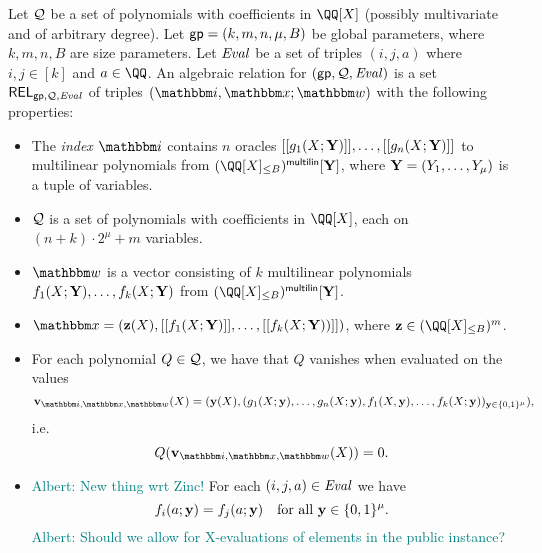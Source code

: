 \documentclass[11pt,letterpaper,usenames,dvipsnames]{article}
\newcommand{\albert}[1]{\textcolor{teal}{Albert: {#1}}}
\begin{document}
Let $\mathcal{Q}$ be a set of polynomials with coefficients in $\QQ[X]$ (possibly multivariate and of arbitrary degree). Let $\mathsf{gp} = (k, m, n, \mu, B)$ be global parameters, where $k,m,n,B$ are size parameters. Let $\text{\emph{Eval}}$ be a set of triples $(i, j, a)$ where $i,j\in [k]$ and $a \in \QQ$. An algebraic relation for $(\mathsf{gp},\mathcal{Q}, \text{\emph{Eval}})$ is a set $\mathsf{REL}_{\mathsf{gp}, \mathcal{Q}, \text{\emph{Eval}}}$ of triples $(\idx, \inp;\wit)$ with the following properties:
\begin{itemize}
	\item The \emph{index} $\idx$ contains $n$ oracles $[[{g_1(X;\mathbf{Y})}]], \ldots, [[{g_n(X;\mathbf{Y})}]]$ to multilinear polynomials from $\mainQpolyring^\multilin[\YY]$, where $\mathbf{Y}=(Y_1,\ldots, Y_\mu) $ is a tuple of variables.
	 \item $\mathcal{Q}$ is a set of polynomials with coefficients in $\QQ[X]$, each on $(n+ k)\cdot 2^\mu + m$ variables.
	\item $\wit$ is a vector consisting of $k$ multilinear polynomials $f_1(X;\mathbf{Y}),\ldots, f_k(X;\mathbf{Y})$ from $\mainQpolyring^{\multilin}[\YY]$. %
	\item $\inp=(\zz(X), \oracle{f_1(X;\YY)}, \ldots, \oracle{f_k(X;\YY))})$, where $\zz\in \mainQpolyring^m$.
    \item For each  polynomial $Q \in \mathcal{Q}$, we have that $Q$ vanishes  when evaluated on the values $$\vv_{\idx, \inp,\wit}(X)=(\yy(X), (g_1(X;\yy),\ldots, g_n(X;\yy), f_1(X,\yy),\ldots, f_k(X;\yy))_{\yy\in \BB^\mu}),$$
    i.e.
    $$
    Q(\vv_{\idx, \inp,\wit}(X)) =0.
    $$
    \item \albert{New thing wrt Zinc!} For each $(i,j,a)\in \text{\emph{Eval}}$ we have
    $$
    f_i(a; \mathbf{y}) = f_j(a;\mathbf{y}) \quad \text{for all } \mathbf{y}\in \{0,1\}^\mu.
    $$
    \albert{Should we allow for X-evaluations of elements in the public instance?}
	\end{itemize}
\end{document}
